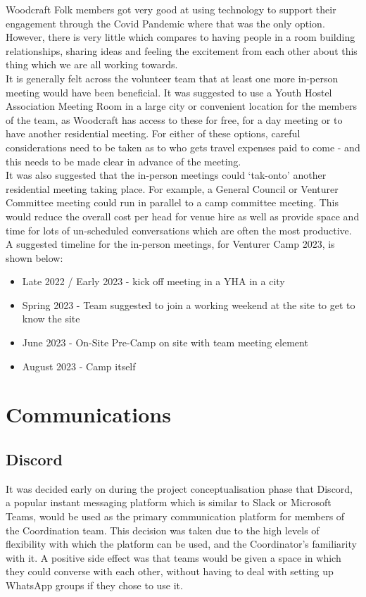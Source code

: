 Woodcraft Folk members got very good at using technology to support their engagement through the Covid Pandemic where that was the only option. However, there is very little which compares to having people in a room building relationships, sharing ideas and feeling the excitement from each other about this thing which we are all working towards. \\

It is generally felt across the volunteer team that at least one more in-person meeting would have been beneficial. It was suggested to use a Youth Hostel Association Meeting Room in a large city or convenient location for the members of the team, as Woodcraft has access to these for free, for a day meeting or to have another residential meeting. For either of these options, careful considerations need to be taken as to who gets travel expenses paid to come - and this needs to be made clear in advance of the meeting.\\

It was also suggested that the in-person meetings could `tak-onto' another residential meeting taking place. For example, a General Council or Venturer Committee meeting could run in parallel to a camp committee meeting. This would reduce the overall cost per head for venue hire as well as provide space and time for lots of un-scheduled conversations which are often the most productive.\\

A suggested timeline for the in-person meetings, for Venturer Camp 2023, is shown below:
\begin{itemize}
    \item Late 2022 / Early 2023 - kick off meeting in a YHA in a city
    \item Spring 2023 - Team suggested to join a working weekend at the site to get to know the site
    \item June 2023 - On-Site Pre-Camp on site with team meeting element
    \item August 2023 - Camp itself
\end{itemize}

\section{Communications}
\subsection{Discord}
It was decided early on during the project conceptualisation phase that Discord, a popular instant messaging platform which is similar to Slack or Microsoft Teams, would be used as the primary communication platform for members of the Coordination team. This decision was taken due to the high levels of flexibility with which the platform can be used, and the Coordinator's familiarity with it. A positive side effect was that teams would be given a space in which they could converse with each other, without having to deal with setting up WhatsApp groups if they chose to use it.\\

